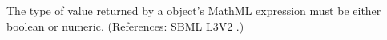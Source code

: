 The type of value returned by a \FunctionDefinition object's 
MathML expression must be either boolean or numeric.  (References: SBML
L3V2 .)
